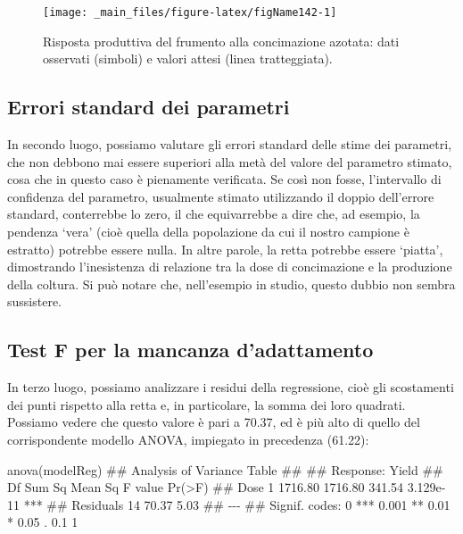 \documentclass[a4paper,12pt,oneside]{book}
\newenvironment{Shaded}{\begin{snugshade}}{\end{snugshade}}
\newcommand{\DocumentationTok}[1]{#1}
\newcommand{\FunctionTok}[1]{#1}
\newcommand{\NormalTok}[1]{#1}
\begin{document}
\begin{figure}

{\centering \texttt{[image: \_main\_files/figure-latex/figName142-1]} 

}

\caption{Risposta produttiva del frumento alla concimazione azotata: dati osservati (simboli) e valori attesi (linea tratteggiata).}\label{fig:figName142}
\end{figure}

\hypertarget{errori-standard-dei-parametri}{%
\subsection{Errori standard dei parametri}\label{errori-standard-dei-parametri}}

In secondo luogo, possiamo valutare gli errori standard delle stime dei parametri, che non debbono mai essere superiori alla metà del valore del parametro stimato, cosa che in questo caso è pienamente verificata. Se così non fosse, l'intervallo di confidenza del parametro, usualmente stimato utilizzando il doppio dell'errore standard, conterrebbe lo zero, il che equivarrebbe a dire che, ad esempio, la pendenza `vera' (cioè quella della popolazione da cui il nostro campione è estratto) potrebbe essere nulla. In altre parole, la retta potrebbe essere `piatta', dimostrando l'inesistenza di relazione tra la dose di concimazione e la produzione della coltura. Si può notare che, nell'esempio in studio, questo dubbio non sembra sussistere.

\hypertarget{test-f-per-la-mancanza-dadattamento}{%
\subsection{Test F per la mancanza d'adattamento}\label{test-f-per-la-mancanza-dadattamento}}

In terzo luogo, possiamo analizzare i residui della regressione, cioè gli scostamenti dei punti rispetto alla retta e, in particolare, la somma dei loro quadrati. Possiamo vedere che questo valore è pari a 70.37, ed è più alto di quello del corrispondente modello ANOVA, impiegato in precedenza (61.22):

\begin{Shaded}
\begin{Highlighting}[]
\FunctionTok{anova}\NormalTok{(modelReg)}
\DocumentationTok{\#\# Analysis of Variance Table}
\DocumentationTok{\#\# }
\DocumentationTok{\#\# Response: Yield}
\DocumentationTok{\#\#           Df  Sum Sq Mean Sq F value    Pr(\textgreater{}F)    }
\DocumentationTok{\#\# Dose       1 1716.80 1716.80  341.54 3.129e{-}11 ***}
\DocumentationTok{\#\# Residuals 14   70.37    5.03                      }
\DocumentationTok{\#\# {-}{-}{-}}
\DocumentationTok{\#\# Signif. codes:  0 \textquotesingle{}***\textquotesingle{} 0.001 \textquotesingle{}**\textquotesingle{} 0.01 \textquotesingle{}*\textquotesingle{} 0.05 \textquotesingle{}.\textquotesingle{} 0.1 \textquotesingle{} \textquotesingle{} 1}
\end{Highlighting}
\end{Shaded}
\end{document}
